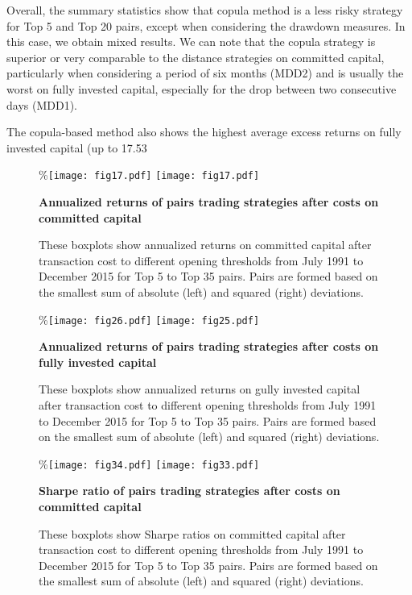 \documentclass[a4paper]{article}
\begin{document}
Overall, the summary statistics show that copula method is a less risky strategy for Top 5 and Top 20 pairs, except when considering the drawdown measures. In this case, we obtain mixed results. We can note that the copula strategy is superior or very comparable to the distance strategies on committed capital, particularly when considering a period of six months (MDD2) and is usually the worst on fully invested capital, especially for the drop between two consecutive days (MDD1).

The copula-based method also shows the highest average excess returns on fully invested capital (up to 17.53\\%
	
	\begin{figure}[H]
		\centering
		\%\texttt{[image: fig17.pdf]}
		\texttt{[image: fig17.pdf]}
		\caption{\textbf{Annualized returns of pairs trading strategies after costs on committed capital}}
		\caption*{\justifying \tiny These boxplots show annualized returns on committed capital after transaction cost to different opening thresholds from July 1991 to December 2015 for Top 5 to Top 35 pairs. Pairs are formed based on the smallest sum of absolute (left) and squared (right) deviations.}
		\label{fig:fig17}
	\end{figure}
	
	\begin{figure}[H]
		\centering
		\%\texttt{[image: fig26.pdf]}
		\texttt{[image: fig25.pdf]}
		\caption{\textbf{Annualized returns of pairs trading strategies after costs on fully invested capital}}
		\caption*{\tiny These boxplots show annualized returns on gully invested capital after transaction cost to different opening thresholds from July 1991 to December 2015 for Top 5 to Top 35 pairs. Pairs are formed based on the smallest sum of absolute (left) and squared (right) deviations.}
		\label{fig:fig25}
	\end{figure}
	
	\begin{figure}[H]
		\centering
		\%\texttt{[image: fig34.pdf]}
		\texttt{[image: fig33.pdf]}
		\caption{\textbf{Sharpe ratio of pairs trading strategies after costs on committed capital}}
		\caption*{\justifying \tiny These boxplots show Sharpe ratios on committed capital after transaction cost to different opening thresholds from July 1991 to December 2015 for Top 5 to Top 35 pairs. Pairs are formed based on the smallest sum of absolute (left) and squared (right) deviations.}
		\label{fig:fig33}
	\end{figure}
	
\end{document}
